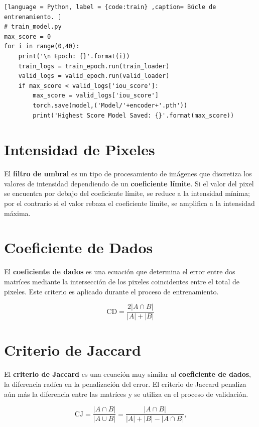 \documentclass[a0,portrait]{a0poster}
\begin{document}
\begin{multicols}{3}
\begin{lstlisting}[language = Python, label = {code:train} ,caption= Búcle de entrenamiento. ]
# train_model.py
max_score = 0 
for i in range(0,40):
    print('\n Epoch: {}'.format(i))
    train_logs = train_epoch.run(train_loader)
    valid_logs = valid_epoch.run(valid_loader)
    if max_score < valid_logs['iou_score']:
        max_score = valid_logs['iou_score']
        torch.save(model,('Model/'+encoder+'.pth'))
        print('Highest Score Model Saved: {}'.format(max_score))
\end{lstlisting}

\section*{Intensidad de Pixeles}
El \textbf{filtro de umbral} es un tipo de procesamiento de imágenes que discretiza los valores de intensidad dependiendo de un \textbf{coeficiente límite}. Si el valor del pixel se encuentra por debajo del coeficiente límite, se reduce a la intensidad mínima; por el contrario si el valor rebaza el coeficiente límite, se amplifica a la intensidad máxima.

\section*{Coeficiente de Dados}
El \textbf{coeficiente de dados} es una ecuación que determina el error entre dos matríces mediante la intersección de los pixeles coincidentes entre el total de pixeles. Este criterio es aplicado durante el proceso de entrenamiento.

\begin{center}
    \begin{equation}
        \text{CD} = \frac{2|A \cap B |}{|A| + |B|}
    \end{equation}        
\end{center}

\section*{Criterio de Jaccard}
El \textbf{criterio de Jaccard} es una ecuación muy similar al \textbf{coeficiente de dados}, la diferencia radíca en la penalización del error. El criterio de Jaccard penaliza aún más la diferencia entre las matríces y se utiliza en el proceso de validación.

\begin{equation}\label{eq:jacc}
    \text{CJ} = \frac{|A \cap B|}{| A \cup B |} = \frac{|A \cap B|}{|A| + |B| - |A \cap B|} \text{,}
\end{equation}


\end{multicols}
\end{document}
